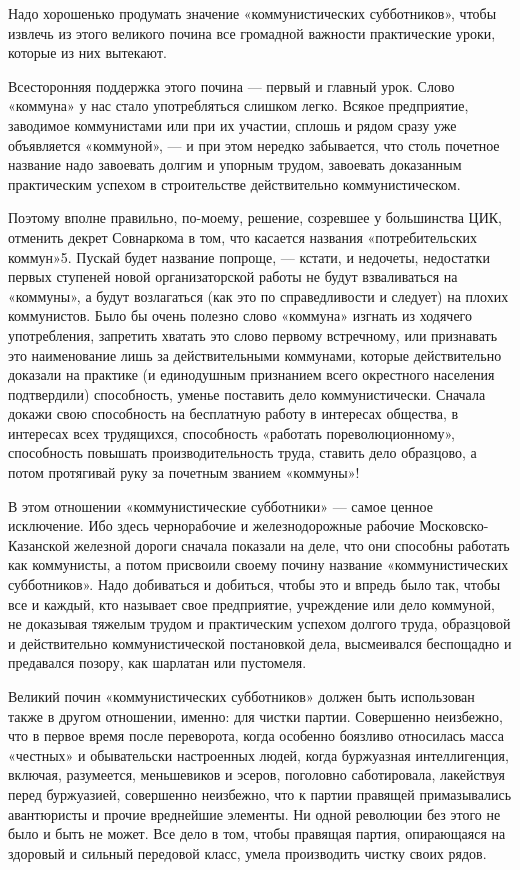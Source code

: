 \documentclass[12pt]{article}
\newcommand{\parnum}{(\arabic{parcount})}
\newcounter{parcount}
\newenvironment{parnumbers}{%
  \par%
  \everypar{\noindent \stepcounter{parcount}\marginpar[]{\parnum}}%
}{}
\begin{document}
\begin{parnumbers}
Надо хорошенько продумать значение «коммунистических субботников», чтобы извлечь из этого великого почина все громадной важности практические уроки, которые из них вытекают.

Всесторонняя поддержка этого почина — первый и главный урок. Слово «коммуна» у нас стало употребляться слишком легко. Всякое предприятие, заводимое коммунистами или при их участии, сплошь и рядом сразу уже объявляется «коммуной», — и при этом нередко забывается, что столь почетное название надо завоевать долгим и упорным трудом, завоевать доказанным практическим успехом в строительстве действительно коммунистическом.

Поэтому вполне правильно, по-моему, решение, созревшее у большинства ЦИК, отменить декрет Совнаркома в том, что касается названия «потребительских коммун»5. Пускай будет название попроще, — кстати, и недочеты, недостатки первых ступеней новой организаторской работы не будут взваливаться на «коммуны», а будут возлагаться (как это по справедливости и следует) на плохих коммунистов. Было бы очень полезно слово «коммуна» изгнать из ходячего употребления, запретить хватать это слово первому встречному, или признавать это наименование лишь за действительными коммунами, которые действительно доказали на практике (и единодушным признанием всего окрестного населения подтвердили) способность, уменье поставить дело коммунистически. Сначала докажи свою способность на бесплатную работу в интересах общества, в интересах всех трудящихся, способность «работать пореволюционному», способность повышать производительность труда, ставить дело образцово, а потом протягивай руку за почетным званием «коммуны»!

В этом отношении «коммунистические субботники» — самое ценное исключение. Ибо здесь чернорабочие и железнодорожные рабочие Московско-Казанской железной дороги сначала показали на деле, что они способны работать как коммунисты, а потом присвоили своему почину название «коммунистических субботников». Надо добиваться и добиться, чтобы это и впредь было так, чтобы все и каждый, кто называет свое предприятие, учреждение или дело коммуной, не доказывая тяжелым трудом и практическим успехом долгого труда, образцовой и действительно коммунистической постановкой дела, высмеивался беспощадно и предавался позору, как шарлатан или пустомеля.

Великий почин «коммунистических субботников» должен быть использован также в другом отношении, именно: для чистки партии. Совершенно неизбежно, что в первое время после переворота, когда особенно боязливо относилась масса «честных» и обывательски настроенных людей, когда буржуазная интеллигенция, включая, разумеется, меньшевиков и эсеров, поголовно саботировала, лакействуя перед буржуазией, совершенно неизбежно, что к партии правящей примазывались авантюристы и прочие вреднейшие элементы. Ни одной революции без этого не было и быть не может. Все дело в том, чтобы правящая партия, опирающаяся на здоровый и сильный передовой класс, умела производить чистку своих рядов.


\end{parnumbers}
\end{document}
